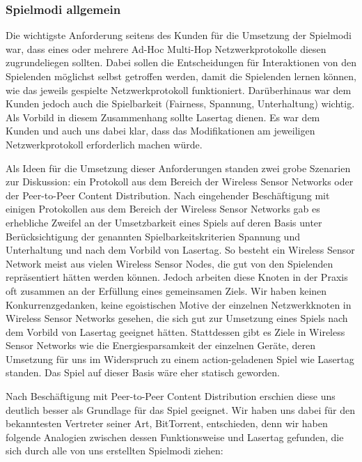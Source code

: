 \subsubsection{Spielmodi allgemein}
Die wichtigste Anforderung seitens des Kunden für die Umsetzung der Spielmodi war, dass eines oder mehrere Ad-Hoc Multi-Hop Netzwerkprotokolle diesen zugrundeliegen sollten. Dabei sollen die Entscheidungen für Interaktionen von den Spielenden möglichst selbst getroffen werden, damit die Spielenden lernen können, wie das jeweils gespielte Netzwerkprotokoll funktioniert. Darüberhinaus war dem Kunden jedoch auch die Spielbarkeit (Fairness, Spannung, Unterhaltung) wichtig. Als Vorbild in diesem Zusammenhang sollte Lasertag dienen. Es war dem Kunden und auch uns dabei klar, dass das Modifikationen am jeweiligen Netzwerkprotokoll erforderlich machen würde.

Als Ideen für die Umsetzung dieser Anforderungen standen zwei grobe Szenarien zur Diskussion: ein Protokoll aus dem Bereich der Wireless Sensor Networks oder der Peer-to-Peer Content Distribution. Nach eingehender Beschäftigung mit einigen Protokollen aus dem Bereich der Wireless Sensor Networks gab es erhebliche Zweifel an der Umsetzbarkeit eines Spiels auf deren Basis unter Berücksichtigung der genannten Spielbarkeitskriterien Spannung und Unterhaltung und nach dem Vorbild von Lasertag. So besteht ein Wireless Sensor Network meist aus vielen Wireless Sensor Nodes, die gut von den Spielenden repräsentiert hätten werden können. Jedoch arbeiten diese Knoten in der Praxis oft zusammen an der Erfüllung eines gemeinsamen Ziels. Wir haben keinen Konkurrenzgedanken, keine egoistischen Motive der einzelnen Netzwerkknoten in Wireless Sensor Networks gesehen, die sich gut zur Umsetzung eines Spiels nach dem Vorbild von Lasertag geeignet hätten. Stattdessen gibt es Ziele in Wireless Sensor Networks wie die Energiesparsamkeit der einzelnen Geräte, deren Umsetzung für uns im Widerspruch zu einem action-geladenen Spiel wie Lasertag standen. Das Spiel auf dieser Basis wäre eher statisch geworden.

Nach Beschäftigung mit Peer-to-Peer Content Distribution erschien diese uns deutlich besser als Grundlage für das Spiel geeignet. Wir haben uns dabei für den bekanntesten Vertreter seiner Art, BitTorrent, entschieden, denn wir haben folgende Analogien zwischen dessen Funktionsweise und Lasertag gefunden, die sich durch alle von uns erstellten Spielmodi ziehen:

